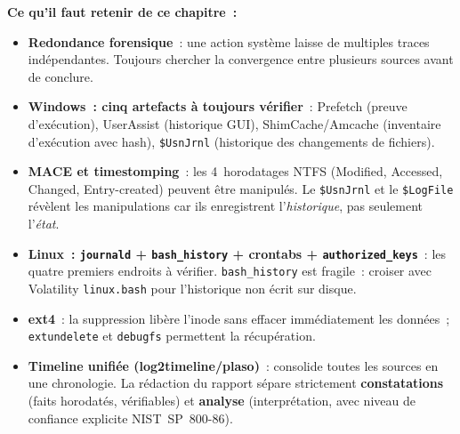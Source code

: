 \begin{boxresume}
\textbf{Ce qu'il faut retenir de ce chapitre~:}
\begin{itemize}
    \item \textbf{Redondance forensique}~: une action système laisse
          de multiples traces indépendantes. Toujours chercher la
          convergence entre plusieurs sources avant de conclure.

    \item \textbf{Windows~: cinq artefacts à toujours vérifier}~:
          Prefetch (preuve d'exécution), UserAssist (historique GUI),
          ShimCache/Amcache (inventaire d'exécution avec hash),
          \texttt{\$UsnJrnl} (historique des changements de fichiers).

    \item \textbf{MACE et timestomping}~: les 4~horodatages NTFS
          (Modified, Accessed, Changed, Entry-created) peuvent être
          manipulés. Le \texttt{\$UsnJrnl} et le \texttt{\$LogFile}
          révèlent les manipulations car ils enregistrent
          l'\emph{historique}, pas seulement l'\emph{état}.

    \item \textbf{Linux~: \texttt{journald} + \texttt{bash\_history}
          + crontabs + \texttt{authorized\_keys}}~: les quatre premiers
          endroits à vérifier. \texttt{bash\_history} est fragile~:
          croiser avec Volatility \texttt{linux.bash} pour l'historique
          non écrit sur disque.

    \item \textbf{ext4}~: la suppression libère l'inode sans effacer
          immédiatement les données~; \texttt{extundelete} et
          \texttt{debugfs} permettent la récupération.

    \item \textbf{Timeline unifiée (log2timeline/plaso)}~: consolide
          toutes les sources en une chronologie. La rédaction du
          rapport sépare strictement \textbf{constatations}
          (faits horodatés, vérifiables) et \textbf{analyse}
          (interprétation, avec niveau de confiance explicite
          NIST~SP~800-86).
\end{itemize}
\end{boxresume}

\bigskip

